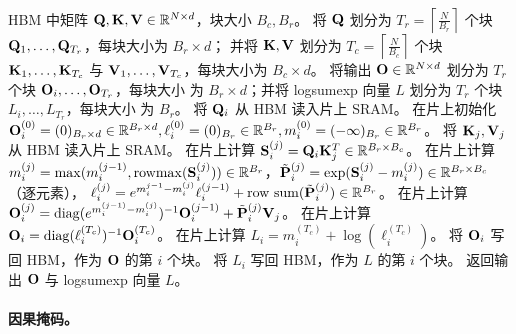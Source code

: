 \begin{algorithm}[H]
  \caption{\small\label{alg:flash2_fwd}\sysname 前向传播}
  \begin{algorithmic}[1]
    \REQUIRE HBM 中矩阵 $\mathbf{Q}, \mathbf{K}, \mathbf{V} \in \mathbb{R}^{N \times d}$，块大小 $B_c, B_r$。
    \STATE \label{alg:stream_attn_split_qkv} 将 $\mathbf{Q}$ 划分为 $T_r = \left\lceil\frac{N}{B_r} \right\rceil$ 个块 $\mathbf{Q}_1, \dots, \mathbf{Q}_{T_r}$，每块大小为 $B_r \times d$；
    并将 $\mathbf{K}, \mathbf{V}$ 划分为 $T_c = \left\lceil \frac{N}{B_c} \right\rceil$ 个块 $\mathbf{K}_1, \dots, \mathbf{K}_{T_c}$ 与
    $\mathbf{V}_1, \dots, \mathbf{V}_{T_c}$，每块大小为 $B_c \times d$。
    \STATE 将输出 $\mathbf{O} \in \mathbb{R}^{N \times d}$ 划分为 $T_r$ 个块 $\mathbf{O}_i, \dots, \mathbf{O}_{T_r}$，每块大小
    为 $B_r \times d$；并将 logsumexp 向量 $L$ 划分为 $T_r$ 个块 $L_i, \dots, L_{T_r}$，每块大小
    为 $B_r$。
     \label{alg:stream_attn_outer_loop}
      \STATE \label{alg:stream_attn_load_q} 将 $\mathbf{Q}_i$ 从 HBM 读入片上 SRAM。
      \STATE \label{alg:stream_attn_init} 在片上初始化 $\mathbf{O}_{i}^{(0)} = (0)_{B_r \times d} \in \mathbb{R}^{B_r \times d}, \ell_{i}^{(0)} = (0)_{B_r} \in \mathbb{R}^{B_r}, m_{i}^{(0)} = (-\infty)_{B_r} \in \mathbb{R}^{B_r}$。
        \STATE \label{alg:stream_attn_load_kv} 将 $\mathbf{K}_j, \mathbf{V}_j$ 从 HBM 读入片上 SRAM。
        \STATE \label{alg:stream_attn_qk} 在片上计算 $\mathbf{S}_{i}^{(j)} = \mathbf{Q}_i \mathbf{K}_j^T \in \mathbb{R}^{B_r \times B_c}$。
        \STATE \label{alg:stream_attn_statistics} 在片上计算
        $m_{i}^{(j)} = \mathrm{max}(m_{i}^{(j-1)}, \mathrm{rowmax}(\mathbf{S}_{i}^{(j)})) \in \mathbb{R}^{B_r}$，$\tilde{\mathbf{P}}_{i}^{(j)} = \exp(\mathbf{S}_{i}^{(j)} - m_{i}^{(j)}) \in \mathbb{R}^{B_r \times B_c}$（逐元素），
        $\ell_{i}^{(j)} = e^{m_{i}^{j-1} - m_{i}^{(j)}} \ell_{i}^{(j-1)} + \mathrm{row\ sum}(\tilde{\mathbf{P}}_{i}^{(j)}) \in \mathbb{R}^{B_r}$。
        \STATE \label{alg:stream_attn_update} 在片上计算
        $\mathbf{O}_{i}^{(j)} = \mathrm{diag}(e^{m_{i}^{(j-1)} - m_{i}^{(j)}})^{-1} \mathbf{O}_{i}^{(j-1)} + \tilde{\mathbf{P}}_{i}^{(j)} \mathbf{V}_j$。
      \ENDFOR
      \STATE 在片上计算 $\mathbf{O}_{i} = \mathrm{diag}(\ell_{i}^{(T_c)})^{-1} \mathbf{O}_{i}^{(T_c)}$。
      \STATE 在片上计算 $L_{i} = m_{i}^{(T_c)} + \log(\ell_i^{(T_c)})$。
      \STATE 将 $\mathbf{O}_{i}$ 写回 HBM，作为 $\mathbf{O}$ 的第 $i$ 个块。
      \STATE 将 $L_{i}$ 写回 HBM，作为 $L$ 的第 $i$ 个块。
    \ENDFOR
    \STATE 返回输出 $\mathbf{O}$ 与 logsumexp 向量 $L$。
  \end{algorithmic}
\end{algorithm}

\paragraph{因果掩码。}

